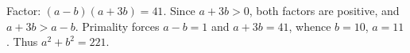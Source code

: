 Factor: $(a-b)(a+3b)=41$. Since $a+3b>0$, both factors are positive, and $a+3b>a-b$. Primality forces $a-b=1$ and $a+3b=41$, whence $b=10$, $a=11$. Thus $\boxed{a^2+b^2=221}$.
